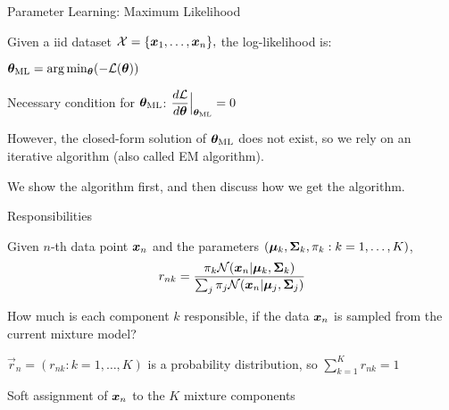 \documentclass[handout,fleqn,aspectratio=169]{beamer}
\begin{document}
\begin{frame}{Parameter Learning: Maximum Likelihood}

\plitemsep 0.1in

\bci
\item Given a iid dataset $\mathcal X= \{\bm{x}_1, \ldots, \bm{x}_n \},$ the log-likelihood is:

\item $\bm{\theta}_{\text{ML}} = \arg \min_{\bm{\theta}} (-{\cal L}(\bm{\theta}))$
\item Necessary condition for $\bm{\theta}_{\text{ML}}$: $\dfrac{d{\cal L}}{d\bm{\theta}}\Big|_{\bm{\theta}_{\text{ML}}} = 0$

\item However, the closed-form solution of $\bm{\theta}_{\text{ML}}$ does not exist, so we rely on an iterative algorithm (also called EM algorithm).

\item We show the algorithm first, and then discuss how we get the algorithm.
\eci
\end{frame}

\begin{frame}{Responsibilities}

\plitemsep 0.1in

\bci
\item {} {} Given $n$-th data point $\bm{x}_n$ and the parameters  $(\bm{\mu}_k, \bm{\Sigma}_k, \pi_k: k=1, \ldots, K)$, 
$$
r_{nk}=  \frac{\pi_k {\cal N}(\bm{x}_n | \bm{\mu}_k, \bm{\Sigma}_k)}{ \sum_{j}\pi_j {\cal N}(\bm{x}_n | \bm{\mu}_j, \bm{\Sigma}_j) }
$$

\item How much is each component $k$ responsible, if the data $\bm{x}_n$ is sampled from the current mixture model? 

\item $\vec{r}_n = (r_{nk}: k=1, \ldots, K)$ is a probability distribution, so $\sum_{k=1}^K r_{nk} =1$

\item Soft assignment of $\bm{x}_n$ to the $K$ mixture components
\eci
\end{frame}
\end{document}
